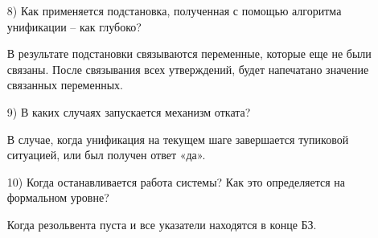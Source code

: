\documentclass[12pt, a4paper]{extarticle}
\begin{document}
\begin{itemize}
	\item[8)] Как применяется подстановка, полученная с помощью алгоритма
	унификации – как глубоко?\par
	В результате подстановки связываются переменные, которые еще не были
	связаны. После связывания всех утверждений, будет напечатано значение
	связанных переменных.
	
	\item[9)] В каких случаях запускается механизм отката?\par
	В случае, когда унификация на текущем шаге завершается тупиковой
	ситуацией, или был получен ответ «да».
	
	\item[10)]  Когда останавливается работа системы? Как это определяется на формальном уровне?\par
	Когда резольвента пуста и все указатели находятся в конце БЗ.
\end{itemize}
\end{document}
